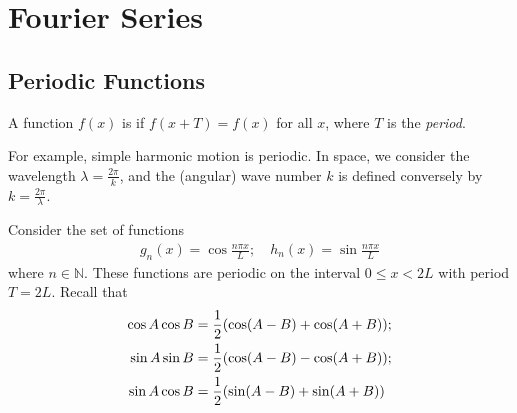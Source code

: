 
\def\npart {IB}
\def\nterm {Michaelmas}
\def\nyear {2022}
\def\nlecturer {Dr E P Shellard}
\def\ncourse {Methods}


\newcommand{\norm}[1]{\left \lVert #1 \right \rVert}
\usepackage{physics}
\newcommand{\inner}[1]{\left\langle{#1}\right\rangle}
\usepackage{bbm}
% 

\author{Based on lectures by \nlecturer \ and notes by thirdsgames.co.uk}



    \maketitle
    \tableofcontents

    \section{Fourier Series}
    \subsection{Periodic Functions}
    \begin{definition}
        A function $f(x)$ is  if $f(x+T) = f(x)$ for all $x$, where $T$ is the \textit{period}.
    \end{definition} 
    For example, simple harmonic motion is periodic.
    In space, we consider the wavelength $\lambda = \frac{2\pi}{k}$, and the (angular) wave number $k$ is defined conversely by $k = \frac{2\pi}{\lambda}$.

    Consider the set of functions
    \begin{align*}
        g_n(x) = \cos \frac{n\pi x}{L};\quad h_n(x) = \sin \frac{n\pi x}{L}
    \end{align*}
    where $n \in \mathbb N$.
    These functions are periodic on the interval $0 \leq x < 2L$ with period $T = 2L$.
    Recall that
    \begin{align*}
        \cos A \cos B & = \frac{1}{2}\qty(\cos(A-B) + \cos(A+B)); \\
        \sin A \sin B & = \frac{1}{2}\qty(\cos(A-B) - \cos(A+B)); \\
        \sin A \cos B & = \frac{1}{2}\qty(\sin(A-B) + \sin(A+B))
    \end{align*}

